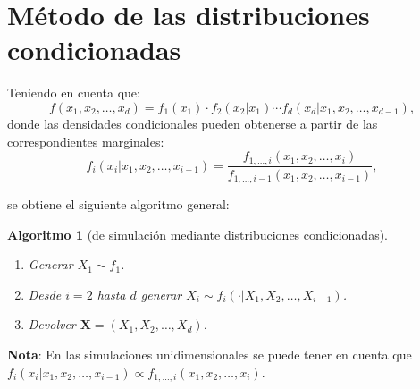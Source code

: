 \documentclass[
]{book}
\theoremstyle{break}
\newtheorem{conjecture}{Algoritmo}[chapter]
\theoremstyle{nonumberplain}
\begin{document}
\hypertarget{distrcond}{%
\section{Método de las distribuciones condicionadas}\label{distrcond}}

Teniendo en cuenta que:
\[f\left( x_1,x_2,\ldots,x_d\right)  =f_1\left( x_1\right)  \cdot
f_2\left( x_2|x_1\right)  \cdots f_d\left( x_d|x_1,x_2,\ldots,x_{d-1}\right),\]
donde las densidades condicionales pueden obtenerse a partir de las
correspondientes marginales:
\[f_i\left( x_i|x_1,x_2,\ldots,x_{i-1}\right)  =\frac{f_{1,\ldots
,i}\left( x_1,x_2,\ldots,x_i\right)  }{f_{1,\ldots,i-1}\left(
x_1,x_2,\ldots,x_{i-1}\right)},\]

se obtiene el siguiente algoritmo general:

\begin{conjecture}[de simulación mediante distribuciones condicionadas]
\protect\hypertarget{cnj:mult-distrcond}{}\label{cnj:mult-distrcond}

\begin{enumerate}
\def\labelenumi{\arabic{enumi}.}
\item
  Generar \(X_1 \sim f_1\).
\item
  Desde \(i=2\) hasta \(d\) generar
  \(X_i \sim f_i\left( \cdot|X_1,X_2,\ldots,X_{i-1}\right)\).
\item
  Devolver \(\mathbf{X} =\left( X_1,X_2,\ldots,X_d\right)\).
\end{enumerate}

\end{conjecture}

\textbf{Nota}: En las simulaciones unidimensionales se puede tener en cuenta que
\(f_i\left( x_i|x_1,x_2,\ldots,x_{i-1}\right) \propto f_{1,\ldots,i}\left( x_1,x_2,\ldots,x_i\right)\).
\end{document}
